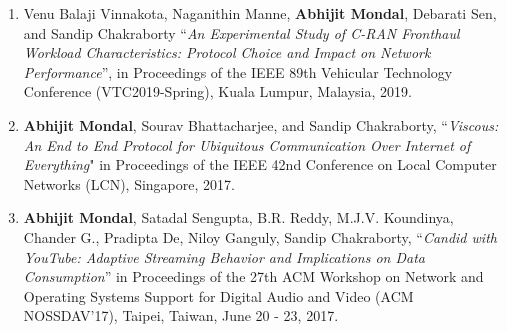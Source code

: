 {\begin{enumerate}
\item Venu Balaji Vinnakota, Naganithin Manne, \textbf{Abhijit Mondal}, Debarati Sen, and Sandip Chakraborty ``\textit{An Experimental Study of C-RAN Fronthaul Workload Characteristics: Protocol Choice and Impact on Network Performance}'', in Proceedings of the IEEE 89th Vehicular Technology Conference (VTC2019-Spring), Kuala Lumpur, Malaysia, 2019.
\item \textbf{Abhijit Mondal}, Sourav Bhattacharjee, and Sandip Chakraborty, ``\textit{Viscous: An End to End Protocol for Ubiquitous Communication Over Internet of Everything}" in Proceedings of the IEEE 42nd Conference on Local Computer Networks (LCN), Singapore, 2017.
\item \textbf{Abhijit Mondal}, Satadal Sengupta, B.R. Reddy, M.J.V. Koundinya, Chander G., Pradipta De, Niloy Ganguly, Sandip Chakraborty, ``\textit{Candid with YouTube: Adaptive Streaming Behavior and Implications on Data Consumption}'' in Proceedings of the 27th ACM Workshop on Network and Operating Systems Support for Digital Audio and Video (ACM NOSSDAV’17), Taipei, Taiwan, June 20 - 23, 2017.

\end{enumerate}
}